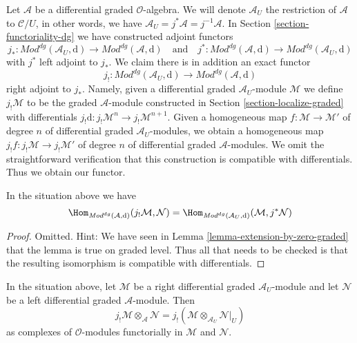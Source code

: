 \medskip\noindent
Let $\mathcal{A}$ be a differential graded $\mathcal{O}$-algebra.
We will denote $\mathcal{A}_U$ the restriction of $\mathcal{A}$
to $\mathcal{C}/U$, in other words, we have
$\mathcal{A}_U = j^*\mathcal{A} = j^{-1}\mathcal{A}$.
In Section \ref{section-functoriality-dg}
we have constructed adjoint functors
$$
j_* :
\textit{Mod}^{dg}(\mathcal{A}_U, \text{d})
\longrightarrow
\textit{Mod}^{dg}(\mathcal{A}, \text{d})
\quad\text{and}\quad
j^* :
\textit{Mod}^{dg}(\mathcal{A}, \text{d})
\longrightarrow
\textit{Mod}^{dg}(\mathcal{A}_U, \text{d})
$$
with $j^*$ left adjoint to $j_*$. We claim there is in addition an
exact functor
$$
j_! :
\textit{Mod}^{dg}(\mathcal{A}_U, \text{d})
\longrightarrow
\textit{Mod}^{dg}(\mathcal{A}, \text{d})
$$
right adjoint to $j_*$. Namely, given a differential graded
$\mathcal{A}_U$-module $\mathcal{M}$ we define $j_!\mathcal{M}$
to be the graded $\mathcal{A}$-module constructed in
Section \ref{section-localize-graded}
with differentials
$j_!\text{d} : j_!\mathcal{M}^n \to j_!\mathcal{M}^{n + 1}$.
Given a homogeneous map
$f : \mathcal{M} \to \mathcal{M}'$ of degree $n$ of differential graded
$\mathcal{A}_U$-modules, we obtain a homogeneous map
$j_!f : j_!\mathcal{M} \to j_!\mathcal{M}'$ of degree $n$
of differential graded $\mathcal{A}$-modules. We omit the
straightforward verification
that this construction is compatible with differentials.
Thus we obtain our functor.

\begin{lemma}
\label{lemma-extension-by-zero-dg}
In the situation above we have
$$
\Hom_{\textit{Mod}^{dg}(\mathcal{A}, \text{d})}(
j_!\mathcal{M}, \mathcal{N}) =
\Hom_{\textit{Mod}^{dg}(\mathcal{A}_U, \text{d})}(
\mathcal{M}, j^*\mathcal{N})
$$
\end{lemma}

\begin{proof}
Omitted. Hint: We have seen in Lemma \ref{lemma-extension-by-zero-graded}
that the lemma is true on graded level. Thus all that needs to be
checked is that the resulting isomorphism is compatible with differentials.
\end{proof}

\begin{lemma}
\label{lemma-tensor-with-extension-by-zero-dg}
In the situation above, let $\mathcal{M}$ be a right differential graded
$\mathcal{A}_U$-module and let $\mathcal{N}$ be a left differential graded
$\mathcal{A}$-module. Then
$$
j_!\mathcal{M} \otimes_\mathcal{A} \mathcal{N} =
j_!(\mathcal{M} \otimes_{\mathcal{A}_U} \mathcal{N}|_U)
$$
as complexes of $\mathcal{O}$-modules
functorially in $\mathcal{M}$ and $\mathcal{N}$.
\end{lemma}

